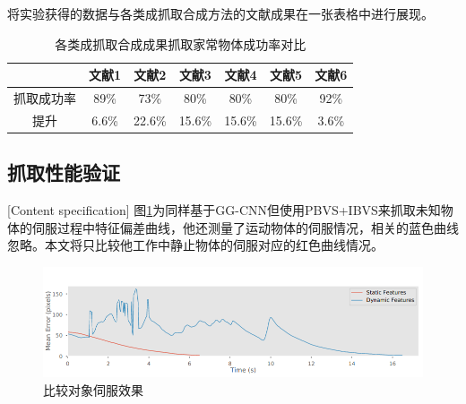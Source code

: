 \documentclass[fontset=fandol,type=bachelor,campus=harbin,bsmainpagenumberline=true]{hithesisbook}
\begin{document}
将实验获得的数据与各类成抓取合成方法的文献成果在一张表格中进行展现。
\begin{table}[htbp]
\caption{各类成抓取合成成果抓取家常物体成功率对比}
\label{各类成抓取合成成果抓取家常物体成功率对比}
\vspace{0.5em}\centering\wuhao
\begin{tabular}{ccccccc}
\toprule[1.5pt]
   & 文献1\cite{lenz2015deep} & 文献2\cite{pinto2016supersizing} & 文献3\cite{johns2016deep} & 文献4\cite{mahler2017dex} & 文献5\cite{levine2018learning} & 文献6\cite{haviland2020control}\\
\midrule[1pt]
 抓取成功率 & 89\% & 73\% & 80\% & 80\% & 80\% & 92\% \\
 提升 & 6.6\% & 22.6\% & 15.6\% & 15.6\% & 15.6\% & 3.6\% \\

\bottomrule[1.5pt]
\end{tabular}
\end{table}


\subsection{抓取性能验证}[Content specification]
图\ref{比较对象伺服效果}为同样基于GG-CNN但使用PBVS+IBVS来抓取未知物体的伺服过程中特征偏差曲线，他还测量了运动物体的伺服情况，相关的蓝色曲线忽略。本文将只比较他工作中静止物体的伺服对应的红色曲线情况。
\begin{figure}[h]
	\centering
	\includegraphics[width=1.0\textwidth]{chapter6/对比工作伺服效果}
	\caption{比较对象伺服效果}
	\label{比较对象伺服效果}
\end{figure}
\end{document}
